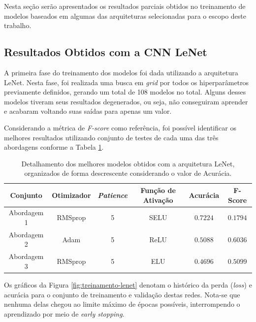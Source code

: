 
Nesta seção serão apresentados os resultados parciais obtidos no treinamento de modelos baseados em algumas das arquiteturas selecionadas para o escopo deste trabalho. 


\subsection{Resultados Obtidos com a CNN LeNet}
\label{sec:lenet}

A primeira fase do treinamento dos modelos foi dada utilizando a arquitetura LeNet. Nesta fase, foi realizada uma busca em \emph{grid} por todos os hiperparâmetros previamente definidos, gerando um total de 108 modelos no total. Alguns desses modelos tiveram seus resultados degenerados, ou seja, não conseguiram aprender e acabaram voltando suas saídas para apenas um valor.

Considerando a métrica de \emph{F-score} como referência, foi possível identificar os melhores resultados utilizando conjunto de testes de cada uma das três abordagens conforme a Tabela \ref{tab:lenet}.

\begin{table}[h!]
\centering
\caption{Detalhamento dos melhores modelos obtidos com a arquitetura LeNet, organizados de forma descrescente considerando o valor de Acurácia.}
\label{tab:lenet}
\begin{tabular}{cccccc}
\toprule
\textbf{Conjunto} & \textbf{Otimizador} & \textbf{\emph{Patience}}  & \textbf{Função de Ativação} & \textbf{Acurácia} & \textbf{F-Score} \\
\midrule
Abordagem 1 & RMSprop & 5 & SELU & $0.7224$ & $0.1794$ \\
Abordagem 2 & Adam & 5 & ReLU & $0.5088$ & $0.6036$ \\
Abordagem 3 & RMSprop & 5 & ELU & $0.4696$ & $0.5099$ \\
\bottomrule
\end{tabular}
\end{table}

Os gráficos da Figura \ref{fig:treinamento-lenet} denotam o histórico da perda (\emph{loss}) e acurácia para o conjunto de treinamento e validação destas redes. Nota-se que nenhuma delas chegou ao limite máximo de épocas possíveis, interrompendo o aprendizado por meio de \emph{early stopping}.


